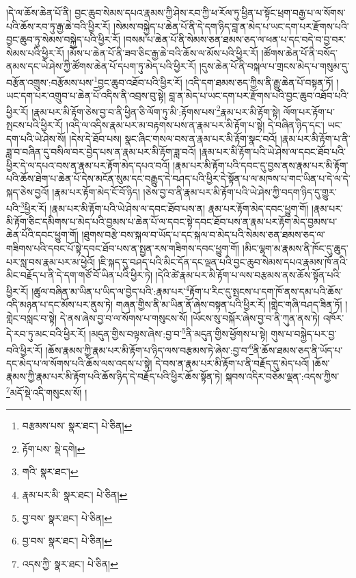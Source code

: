།དེ་ལ་ཆོས་ཆེན་པོ་ནི། བྱང་ཆུབ་སེམས་དཔའ་རྣམས་ཀྱི་ཤེས་རབ་ཀྱི་ཕ་རོལ་ཏུ་ཕྱིན་པ་སྟོང་ཕྲག་བརྒྱ་པ་ལ་སོགས་པའི་ཆོས་རབ་ཏུ་རྒྱ་ཆེ་བའི་ཕྱིར་རོ། །སེམས་བསྐྱེད་པ་ཆེན་པོ་ནི་དེ་དག་ཉིད་བླ་ན་མེད་པ་ཡང་དག་པར་རྫོགས་པའི་བྱང་ཆུབ་ཏུ་སེམས་བསྐྱེད་པའི་ཕྱིར་རོ། །བསམ་པ་ཆེན་པོ་ནི་སེམས་ཅན་ཐམས་ཅད་ལ་ཕན་པ་དང་བདེ་བ་བྱ་བར་སེམས་པའི་ཕྱིར་རོ། །མོས་པ་ཆེན་པོ་ནི་ཟབ་ཅིང་རྒྱ་ཆེ་བའི་ཆོས་ལ་མོས་པའི་ཕྱིར་རོ། །ཚོགས་ཆེན་པོ་ནི་བསོད་ནམས་དང་ཡེ་ཤེས་ཀྱི་ཚོགས་ཆེན་པོ་དཔག་ཏུ་མེད་པའི་ཕྱིར་རོ། །དུས་ཆེན་པོ་ནི་བསྐལ་པ་གྲངས་མེད་པ་གསུམ་དུ་བརྩོན་འགྲུས་:བརྩོམས་པས་\footnote{བརྩམས་པས་  སྣར་ཐང་།  པེ་ཅིན། }བྱང་ཆུབ་འཐོབ་པའི་ཕྱིར་རོ། །འདི་དག་ཐམས་ཅད་ཀྱིས་ནི་རྒྱུ་ཆེན་པོ་བསྟན་ཏོ། །ཡང་དག་པར་འགྲུབ་པ་ཆེན་པོ་འདིས་ནི་འབྲས་བུ་སྟེ། བླ་ན་མེད་པ་ཡང་དག་པར་རྫོགས་པའི་བྱང་ཆུབ་འཐོབ་པའི་ཕྱིར་རོ། །རྣམ་པར་མི་རྟོག་ཅེས་བྱ་བ་ནི་ཕྱིན་ཅི་ལོག་ཏུ་མི་:རྟོགས་པས་\footnote{རྟོག་པས་  སྡེ་དགེ། }རྣམ་པར་མི་རྟོག་སྟེ། ལོག་པར་རྟོག་པ་སྤངས་པའི་ཕྱིར་རོ། །འདི་ལ་འདིས་རྣམ་པར་མ་བརྟགས་པས་ན་རྣམ་པར་མི་རྟོག་པ་སྟེ། དེ་བཞིན་ཉིད་དང་། ཡང་དག་པའི་ཡེ་ཤེས་སོ། །དེས་དེ་ཐོབ་པས། སྣང་ཞིང་གསལ་བས་ན་རྣམ་པར་མི་རྟོག་སྣང་བའོ། །རྣམ་པར་མི་རྟོག་པ་ནི་ཟླ་བ་བཞིན་དུ་བསིལ་བར་བྱེད་པས་ན་རྣམ་པར་མི་རྟོག་ཟླ་བའོ། །རྣམ་པར་མི་རྟོག་པའི་ཡེ་ཤེས་ལ་དབང་ཐོབ་པའི་ཕྱིར་དེ་ལ་དཔའ་བས་ན་རྣམ་པར་རྟོག་མེད་དཔའ་བའོ། །རྣམ་པར་མི་རྟོག་པའི་དབང་དུ་བྱས་ནས་རྣམ་པར་མི་རྟོག་པའི་ཆོས་ཐེག་པ་ཆེན་པོ་དེས་མངོན་སུམ་དང་བརྒྱུད་དེ་བཤད་པའི་ཕྱིར་དེ་སྟོན་པ་ལ་མཁས་པ་གང་ཡིན་པ་དེ་ལ་དེ་སྐད་ཅེས་བྱའོ། །རྣམ་པར་རྟོག་མེད་ངོ་བོ་ཉིད། །ཅེས་བྱ་བ་ནི་རྣམ་པར་མི་རྟོག་པའི་ཡེ་ཤེས་ཀྱི་བདག་ཉིད་དུ་གྱུར་པའི་\footnote{གའི་  སྣར་ཐང་། }ཕྱིར་རོ། །རྣམ་པར་མི་རྟོག་པའི་ཡེ་ཤེས་ལ་དབང་ཐོབ་པས་ན། རྣམ་པར་རྟོག་མེད་དབང་ཕྱུག་གོ། །རྣམ་པར་མི་རྟོག་ཅིང་དམིགས་པ་མེད་པའི་བྱམས་པ་ཆེན་པོ་ལ་དབང་སྟེ་དབང་ཐོབ་པས་ན་རྣམ་པར་རྟོག་མེད་བྱམས་པ་ཆེན་པོའི་དབང་ཕྱུག་གོ། །ཐུགས་བརྩེ་བས་སྐལ་བ་ཡོད་པ་དང་སྐལ་བ་མེད་པའི་སེམས་ཅན་ཐམས་ཅད་ལ་གཟིགས་པའི་དབང་པོ་སྟེ་དབང་ཐོབ་པས་ན་སྤྱན་རས་གཟིགས་དབང་ཕྱུག་གོ། །མིང་ལྷག་མ་རྣམས་ནི་ཁོང་དུ་ཆུད་པར་སླ་བས་རྣམ་པར་མ་ཕྱེའོ། །ཇི་སྐད་དུ་བཤད་པའི་མིང་དོན་དང་ལྡན་པའི་བྱང་ཆུབ་སེམས་དཔའ་རྣམས་ཁོ་ནའི་མིང་བརྗོད་པ་ནི་དེ་དག་གཙོ་བོ་ཡིན་པའི་ཕྱིར་ཏེ། །དེའི་ཚེ་རྣམ་པར་མི་རྟོག་པ་ལས་བརྩམས་ནས་ཆོས་སྟོན་པའི་ཕྱིར་རོ། །ཚུལ་བཞིན་མ་ཡིན་པ་ཡིད་ལ་བྱེད་པའི་:རྣམ་པར་\footnote{རྣམ་པར་མི་  སྣར་ཐང་།  པེ་ཅིན། }རྟོག་པ་རིང་དུ་སྤངས་པ་དག་ཁོ་ནས་དམ་པའི་ཆོས་འདི་མཉན་པ་དང་མོས་པར་ནུས་ཏེ། གཞན་གྱིས་ནི་མ་ཡིན་ནོ་ཞེས་བསྟན་པའི་ཕྱིར་རོ། །གླེང་གཞི་བཤད་ཟིན་ཏོ། །གླེང་བསླང་བ་སྟེ། དེ་ནས་ཞེས་བྱ་བ་ལ་སོགས་པ་གསུངས་སོ། །ཡོངས་སུ་བསྐོར་ཞེས་བྱ་བ་ནི་ཀུན་ནས་ཏེ། འཁོར་དེ་རབ་ཏུ་མང་བའི་ཕྱིར་རོ། །མདུན་གྱིས་བལྟས་ཞེས་:བྱ་བ་\footnote{བྱ་བས་  སྣར་ཐང་།  པེ་ཅིན། }ནི་མདུན་གྱིས་ཕྱོགས་པ་སྟེ། གུས་པ་བསྐྱེད་པར་བྱ་བའི་ཕྱིར་རོ། །ཆོས་རྣམས་ཀྱི་རྣམ་པར་མི་རྟོག་པ་ཉིད་ལས་བརྩམས་ཏེ་ཞེས་:བྱ་བ་\footnote{བྱ་བས་  སྣར་ཐང་།  པེ་ཅིན། }ནི་ཆོས་ཐམས་ཅད་ནི་ཡོད་པ་དང་མེད་པ་ལ་སོགས་པའི་ཆོས་ལས་འདས་པ་སྟེ། དེ་བས་ན་རྣམ་པར་མི་རྟོག་པ་ནི་བརྗོད་དུ་མེད་པའོ། །ཆོས་རྣམས་ཀྱི་རྣམ་པར་མི་རྟོག་པའི་ཆོས་ཉིད་དེ་བརྗོད་པའི་ཕྱིར་ཆོས་སྟོན་ཏེ། སྐབས་འདིར་བཅོམ་ལྡན་:འདས་ཀྱིས་\footnote{འདས་ཀྱི་  སྣར་ཐང་།  པེ་ཅིན། }མདོ་སྡེ་འདི་གསུངས་སོ། །
